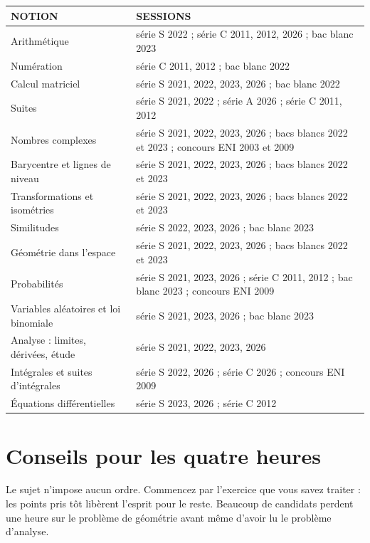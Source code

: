 \begin{center}
\setlength{\tabcolsep}{7pt}
\renewcommand{\arraystretch}{1.3}
\begin{tabular}{@{}L{4.3cm} L{8.4cm}@{}}
\toprule
\textsf{\footnotesize\bfseries NOTION} &
\textsf{\footnotesize\bfseries SESSIONS} \\
\midrule
Arithmétique &
  série S 2022 ; série C 2011, 2012, 2026 ; bac blanc 2023 \\
Numération &
  série C 2011, 2012 ; bac blanc 2022 \\
Calcul matriciel &
  série S 2021, 2022, 2023, 2026 ; bac blanc 2022 \\
Suites &
  série S 2021, 2022 ; série A 2026 ; série C 2011, 2012 \\
Nombres complexes &
  série S 2021, 2022, 2023, 2026 ; bacs blancs 2022 et 2023 ;
  concours ENI 2003 et 2009 \\
Barycentre et lignes de niveau &
  série S 2021, 2022, 2023, 2026 ; bacs blancs 2022 et 2023 \\
Transformations et isométries &
  série S 2021, 2022, 2023, 2026 ; bacs blancs 2022 et 2023 \\
Similitudes &
  série S 2022, 2023, 2026 ; bac blanc 2023 \\
Géométrie dans l'espace &
  série S 2021, 2022, 2023, 2026 ; bacs blancs 2022 et 2023 \\
Probabilités &
  série S 2021, 2023, 2026 ; série C 2011, 2012 ; bac blanc 2023 ;
  concours ENI 2009 \\
Variables aléatoires et loi binomiale &
  série S 2021, 2023, 2026 ; bac blanc 2023 \\
Analyse : limites, dérivées, étude &
  série S 2021, 2022, 2023, 2026 \\
Intégrales et suites d'intégrales &
  série S 2022, 2026 ; série C 2026 ; concours ENI 2009 \\
Équations différentielles &
  série S 2023, 2026 ; série C 2012 \\
\bottomrule
\end{tabular}
\end{center}

\section*{Conseils pour les quatre heures}

Le sujet n'impose aucun ordre. Commencez par l'exercice que vous savez
traiter : les points pris tôt libèrent l'esprit pour le reste. Beaucoup de
candidats perdent une heure sur le problème de géométrie avant même d'avoir
lu le problème d'analyse.

